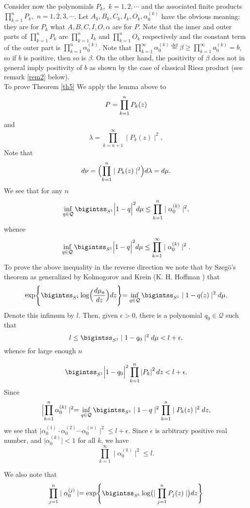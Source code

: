\documentclass{amsart}
\theoremstyle{definition}
\theoremstyle{remark}
\numberwithin{equation}{section}
\newcommand{\egdef}{\stackrel{\textrm {def}}{=}}
\newcommand{\1}{\mathbb{1}}
\begin{document}
Consider now the polynomials $P_k,$ $k =1,2,\cdots$  and the associated finite products
$\prod_{k=1}^{n}P_k,$ $n =1,2,3,\cdots$. Let $A_k, B_k, C_k, I_k, O_k, \alpha_0^{(k)}$ have the obvious meaning: they are for $P_k$ what $A, B, C, I, O, \alpha$ are for  $ P$. Note that the inner and outer parts of $\prod_{k=1}^nP_k$ are $\prod_{k=1}^nI_k$ and $\prod_{k=1}^nO_k$
respectively and the constant term of the outer part is $\prod_{k=1}^n\alpha_0^{(k)}$. Note that $ \prod_{k=1}^\infty \alpha_0^{(k)} \egdef \beta \geq \prod_{k=1}^\infty a_0^{(k)} = b$, so if $b$ is positive, then so is $\beta$.
On the other hand, the positivity of $\beta$ does not in general imply positivity of $b$ as shown by the case of classical Riesz product (see remark \ref{rem2} below).\\

To prove Theorem \ref{th5} We apply the lemma  above to $$P = \prod_{k=1}^n \emph{}P_k(z)$$ and
$$\lambda = \prod_{k=n+1}^\infty\mid P_k(z)\mid^2,$$
Note that $$d\nu =\Bigl (\prod_{k=1}^n\mid P_k(z)\mid^2\Bigr)d\lambda = d\mu.$$
We see that for any $n$
$$\inf_{q\in {\mathcal Q}} \bigintss_{S^1}\Bigl| 1 - q\Bigr|^2 d\mu \leq \prod_{k=1}^n\mid\alpha_0^{(k)}\mid^2,$$
whence
  $$\inf_{q\in {\mathcal Q}} \bigintss_{S^1}\Bigl| 1 - q\Bigr|^2 d\mu \leq \prod_{k=1}^\infty\mid\alpha_0^{(k)}\mid^2.$$
\noindent{}To prove the above inequality in the reverse direction we note that by
Szeg\"o's theorem as generalized by Kolmogorov and Krein (K. H. Hoffman \cite{Hoffman}) that
$$\exp \Biggr\{\bigintss_{S^1}\log \Bigr(\frac{d\mu_a}{dz}\Bigl)dz\Biggl\} = \inf_{q\in {\mathcal Q}} \bigintss_{S^1}\mid 1 - q(z)\mid^2 d\mu.$$ Denote this infimum by $l$. Then, given $\epsilon > 0$, there is a polynomial $q_0\in {\mathcal Q}$ such that
$$l \leq \bigintss_{S^1}\mid 1 - q_0\mid^2d\mu < l + \epsilon,$$
\noindent{}whence for large enough $n$

$$ \bigintss_{S^1}\Bigl| 1 - q_0\Bigr|^2\prod_{k=1}^n\left| P_k\right|^2dz < l +\epsilon.$$
\noindent{}Since $$\Bigl|\prod_{k=1}^n \alpha_0^{(k)}\mid^2 =\inf_{q\in {\mathcal Q}}\bigintss_{S^1}\mid 1- q\mid^2 \prod_{k=1}^n\mid P_k(z)\mid^2dz,$$
\noindent{}we see that $\mid \alpha_0^{(1)}\cdot\alpha_0^{(2)}\cdots \alpha_0^{(n)}\mid^2 \leq l +\epsilon$. Since $\epsilon $ is arbitrary positive real number, and $\mid \alpha_0^{(k)} \mid <  1$ for all $k$, we have
$$\prod_{k=1}^\infty\mid\alpha_0^{(k)}\mid^2 \leq l.$$

\noindent{}We also note that
$$\prod_{j=1}^n\mid\alpha_0^{(j)}\mid = \exp\Biggl\{\bigintss_{S^1}\log \bigl(\mid \prod_{j=1}^n P_j(z)\mid\bigr) dz\Biggr\}$$
\end{document}

